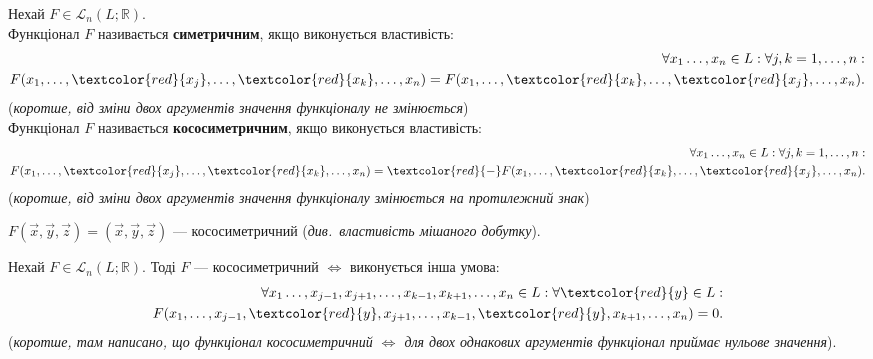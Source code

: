 \documentclass{math_library}
\begin{document}
	\begin{definition}
	Нехай $F \in \mathcal{L}_n(L;\mathbb{R})$.\\
	Функціонал $F$ називається \textbf{симетричним}, якщо виконується властивість:
	\begin{align*}
		\forall x_1 \dots, x_n \in L: \forall j,k = 1,\dots,n:\\
	F(x_1, \dots, \textcolor{red}{x_j}, \dots, \textcolor{red}{x_k}, \dots, x_n) = F(x_1, \dots, \textcolor{red}{x_k}, \dots, \textcolor{red}{x_j}, \dots, x_n).
	\end{align*}
	(\textit{коротше, від зміни двох аргументів значення функціоналу не змінюється})\\
	Функціонал $F$ називається \textbf{кососиметричним}, якщо виконується властивість:
	\begin{align*}
	\forall x_1 \dots, x_n \in L: \forall j,k = 1,\dots,n:\\
	F(x_1, \dots, \textcolor{red}{x_j}, \dots, \textcolor{red}{x_k}, \dots, x_n) = \textcolor{red}{-}F(x_1, \dots, \textcolor{red}{x_k}, \dots, \textcolor{red}{x_j}, \dots, x_n).
	\end{align*}
	(\textit{коротше, від зміни двох аргументів значення функціоналу змінюється на протилежний знак})
	\end{definition}
	
	\begin{example}
	$F(\vec{x},\vec{y},\vec{z}) = (\vec{x}, \vec{y}, \vec{z})$ --- кососиметричний (\textit{див.\ властивість мішаного добутку}).
	\end{example}
	
	\begin{theorem}
	Нехай $F \in \mathcal{L}_n(L;\mathbb{R})$. Тоді $F$ --- кососиметричний $\iff$ виконується інша умова:
	\begin{align*}
	\forall x_1 \dots, x_{j-1}, x_{j+1}, \dots, x_{k-1}, x_{k+1}, \dots, x_{n} \in L: \forall \textcolor{red}{y} \in L: \\ 
	F(x_1,\dots, x_{j-1}, \textcolor{red}{y}, x_{j+1}, \dots, x_{k-1}, \textcolor{red}{y}, x_{k+1}, \dots, x_n) = 0.
	\end{align*}
	(\textit{коротше, там написано, що функціонал кососиметричний $\iff$ для двох однакових аргументів функціонал приймає нульове значення}).
	\end{theorem}
	
\end{document}
